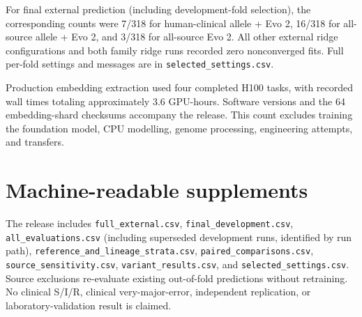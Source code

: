 \documentclass[
  10pt,
]{article}
\begin{document}
For final external prediction (including development-fold selection),
the corresponding counts were 7/318 for human-clinical allele + Evo 2,
16/318 for all-source allele + Evo 2, and 3/318 for all-source Evo 2.
All other external ridge configurations and both family ridge runs
recorded zero nonconverged fits. Full per-fold settings and messages are
in \texttt{selected\_settings.csv}.

Production embedding extraction used four completed H100 tasks, with
recorded wall times totaling approximately 3.6 GPU-hours. Software
versions and the 64 embedding-shard checksums accompany the release.
This count excludes training the foundation model, CPU modelling, genome
processing, engineering attempts, and transfers.

\section{Machine-readable
supplements}\label{machine-readable-supplements}

The release includes \texttt{full\_external.csv},
\texttt{final\_development.csv}, \texttt{all\_evaluations.csv}
(including superseded development runs, identified by run path),
\texttt{reference\_and\_lineage\_strata.csv},
\texttt{paired\_comparisons.csv}, \texttt{source\_sensitivity.csv},
\texttt{variant\_results.csv}, and \texttt{selected\_settings.csv}.
Source exclusions re-evaluate existing out-of-fold predictions without
retraining. No clinical S/I/R, clinical very-major-error, independent
replication, or laboratory-validation result is claimed.
\end{document}
